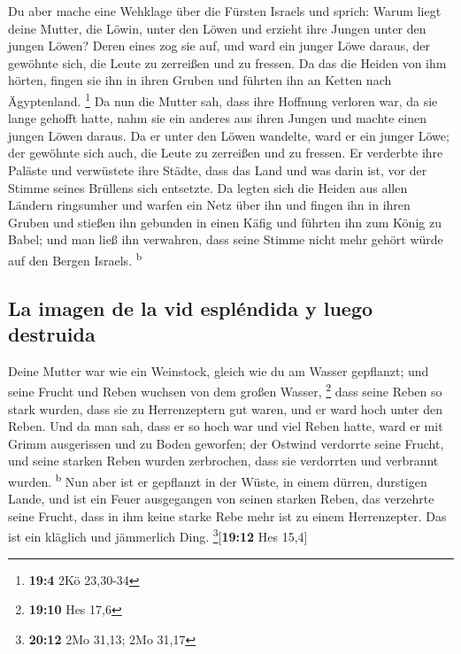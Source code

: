  Du aber mache eine Wehklage über die Fürsten Israels
 und sprich: Warum liegt deine Mutter, die Löwin, unter
den Löwen und erzieht ihre Jungen unter den jungen Löwen? 
Deren eines zog sie auf, und ward ein junger Löwe daraus, der gewöhnte
sich, die Leute zu zerreißen und zu fressen.  Da das die
Heiden von ihm hörten, fingen sie ihn in ihren Gruben und führten ihn an
Ketten nach Ägyptenland. \footnote{\textbf{19:4} 2Kö 23,30-34}
 Da nun die Mutter sah, dass ihre Hoffnung verloren war,
da sie lange gehofft hatte, nahm sie ein anderes aus ihren Jungen und
machte einen jungen Löwen daraus.  Da er unter den Löwen
wandelte, ward er ein junger Löwe; der gewöhnte sich auch, die Leute zu
zerreißen und zu fressen.  Er verderbte ihre Paläste und
verwüstete ihre Städte, dass das Land und was darin ist, vor der Stimme
seines Brüllens sich entsetzte.  Da legten sich die Heiden
aus allen Ländern ringsumher und warfen ein Netz über ihn und fingen ihn
in ihren Gruben  und stießen ihn gebunden in einen Käfig
und führten ihn zum König zu Babel; und man ließ ihn verwahren, dass
seine Stimme nicht mehr gehört würde auf den Bergen Israels.
\textsuperscript{b}

\hypertarget{la-imagen-de-la-vid-espluxe9ndida-y-luego-destruida}{%
\subsection{La imagen de la vid espléndida y luego
destruida}\label{la-imagen-de-la-vid-espluxe9ndida-y-luego-destruida}}

 Deine Mutter war wie ein Weinstock, gleich wie du am
Wasser gepflanzt; und seine Frucht und Reben wuchsen von dem großen
Wasser, \footnote{\textbf{19:10} Hes 17,6}  dass seine
Reben so stark wurden, dass sie zu Herrenzeptern gut waren, und er ward
hoch unter den Reben. Und da man sah, dass er so hoch war und viel Reben
hatte,  ward er mit Grimm ausgerissen und zu Boden
geworfen; der Ostwind verdorrte seine Frucht, und seine starken Reben
wurden zerbrochen, dass sie verdorrten und verbrannt wurden.
\textsuperscript{b}  Nun aber ist er gepflanzt in der
Wüste, in einem dürren, durstigen Lande,  und ist ein
Feuer ausgegangen von seinen starken Reben, das verzehrte seine Frucht,
dass in ihm keine starke Rebe mehr ist zu einem Herrenzepter. Das ist
ein kläglich und jämmerlich Ding. \footnote{\textbf{20:12} 2Mo 31,13;
  2Mo 31,17}{[}\textbf{19:12} Hes 15,4{]}

